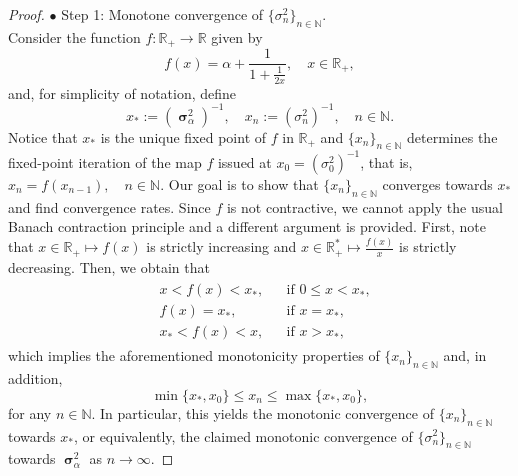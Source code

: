 \documentclass[reqno]{amsart}
\DeclareMathOperator{\bsigma}{\boldsymbol{\sigma}}
\numberwithin{equation}{section}
\begin{document}
{\begin{proof}
$\bullet$ {\sc Step 1}: Monotone convergence of $\{\sigma_n^2\}_{n\in \mathbb{N}}$.\\
Consider the function $f:\mathbb{R}_+\longrightarrow \mathbb{R}$ given by
$$f(x)=\alpha+\frac{1}{1+\frac{1}{2x}},\quad x\in \mathbb{R}_+,$$
and, for simplicity of notation, define
\begin{equation}\label{E-contraction-variance-change-variables}
x_*:=(\bsigma_\alpha^2)^{-1},\quad x_n:=(\sigma_n^2)^{-1},\quad n\in \mathbb{N}.
\end{equation}
Notice that $x_*$ is the unique fixed point of $f$ in $\mathbb{R}_+$ and $\{x_n\}_{n\in \mathbb{N}}$ determines the fixed-point iteration of the map $f$ issued at $x_0=(\sigma_0^2)^{-1}$, that is, $x_n=f(x_{n-1}),\quad n\in \mathbb{N}$. Our goal is to show that $\{x_n\}_{n\in \mathbb{N}}$ converges towards $x_*$ and find convergence rates. Since $f$ is not contractive, we cannot apply the usual Banach contraction principle and a different argument is provided. First, note that  $x\in \mathbb{R}_+\mapsto f(x)$ is strictly increasing and $x\in\mathbb{R}_+^*\mapsto \frac{f(x)}{x}$ is strictly decreasing. Then, we obtain that
\begin{align*}
\begin{aligned}
&x<f(x)<x_*, & & \mbox{if } 0\leq x<x_*,\\
& f(x)=x_*, & & \mbox{if }x=x_*,\\
&x_*<f(x)<x, &  &\mbox{if }x>x_*,
\end{aligned}
\end{align*}
which implies the aforementioned monotonicity properties of $\{x_n\}_{n\in \mathbb{N}}$ and, in addition,
\begin{equation}\label{E-contraction-variance-uniform-bound}
\min\{x_*,x_0\}\leq x_n\leq \max\{x_*,x_0\},
\end{equation}
for any $n\in \mathbb{N}$. In particular, this yields the monotonic convergence of $\{x_n\}_{n\in \mathbb{N}}$ towards $x_*$, or equivalently, the claimed monotonic convergence of $\{\sigma_n^2\}_{n\in \mathbb{N}}$ towards $\bsigma_\alpha^2$ as $n\rightarrow \infty$. 

\medskip


\end{proof}}
\end{document}
